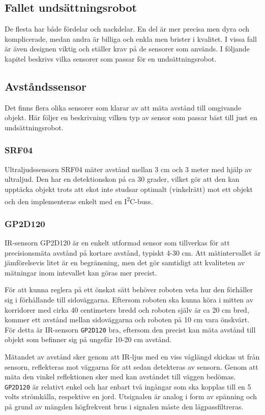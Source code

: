 \documentclass[11pt]{article}
\begin{document}
\begin{flushleft}
\pagebreak
\section{Fallet undsättningsrobot}
De flesta har både fördelar och nackdelar. En del är mer precisa men dyra och komplicerade, medan andra är billiga och enkla men brister i kvalitet. I vissa fall är även designen viktig och ställer krav på de sensorer som används. I följande kapitel beskrivs vilka sensorer som passar för en undsättningsrobot. 

\subsection{Avståndssensor}
Det finns flera olika sensorer som klarar av att mäta avstånd till omgivande objekt. Här följer en beskrivning vilken typ av sensor som passar bäst till just en undsättningsrobot. 

\subsubsection{SRF04} %
Ultraljudssensorn SRF04 mäter avstånd mellan 3 cm och 3 meter med hjälp av ultraljud. Den har en detektionskon på ca 30 grader, vilket gör att den kan upptäcka objekt trots att ekot inte studsar optimalt (vinkelrätt) mot ett objekt och den implementeras enkelt med en I\textsuperscript{2}C-buss. \cite{Devantech}

\subsubsection{GP2D120} %
IR-sensorn GP2D120 är en enkelt utformad sensor som tillverkas för att precisionsmäta avstånd på kortare avstånd, typiskt 4-30 cm. Att mätintervallet är jämförelsevis litet är en begränsning, men det gör samtidigt att kvaliteten av mätningar inom intevallet kan göras mer precist. 

För att kunna reglera på ett önskat sätt behöver roboten veta hur den förhåller sig i förhållande till sidoväggarna. Eftersom roboten ska kunna köra i mitten av korridorer med cirka 40 centimeters bredd och roboten själv är ca 20 cm bred, kommer ett avstånd mellan sidoväggarna och roboten på 10 cm vara önskvärt. För detta är IR-sensorn \verb+GP2D120+ bra, eftersom den precist kan mäta avstånd till objekt som befinner sig på ungefär 10-20 cm avstånd.

Mätandet av avstånd sker genom att IR-ljus med en viss våglängd skickas ut från sensorn, reflekteras mot väggarna för att sedan detekteras av sensorn. Genom att mäta den vinkel reflektionen sker med kan avståndet till väggen bedömas. \verb+GP2D120+ är relativt enkel och har enbart två ingångar som ska kopplas till en 5 volts strömkälla, respektive en jord.  Utsignalen är analog i form av spänning och på grund av mängden högfrekvent brus i signalen måste den lågpassfiltreras.


\end{flushleft}
\end{document}

